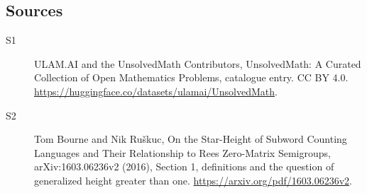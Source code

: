 \documentclass[11pt]{article}
\begin{document}
\subsection{Sources}
\begin{description}
\item[\hypertarget{source:statement:1}{S1}] ULAM.AI and the UnsolvedMath Contributors, UnsolvedMath: A Curated Collection of Open Mathematics Problems, catalogue entry. CC BY 4.0. \url{https://huggingface.co/datasets/ulamai/UnsolvedMath}.
\item[\hypertarget{source:statement:2}{S2}] Tom Bourne and Nik Ruškuc, On the Star-Height of Subword Counting Languages and Their Relationship to Rees Zero-Matrix Semigroups, arXiv:1603.06236v2 (2016), Section 1, definitions and the question of generalized height greater than one. \url{https://arxiv.org/pdf/1603.06236v2}.
\end{description}
\label{end:statement}
\end{document}
